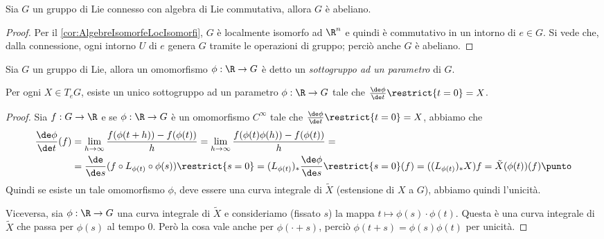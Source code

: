 \begin{corollary}
	Sia $G$ un gruppo di Lie connesso con algebra di Lie commutativa, allora $G$ è abeliano.
\end{corollary}
\begin{proof}
	Per il \cref{cor:AlgebreIsomorfeLocIsomorfi}, $G$ è localmente isomorfo ad $\R^n$ e quindi è commutativo in un intorno di $e \in G$. Si vede che, dalla connessione, ogni intorno $U$ di $e$ genera $G$ tramite le operazioni di gruppo; perciò anche $G$ è abeliano.
\end{proof}


\begin{definition} 
	Sia $G$ un gruppo di Lie, allora un omomorfismo $\phi : \R \to G$ è detto un \emph{sottogruppo ad un parametro} di $G$.
\end{definition}


\begin{corollary}
	Per ogni $X \in T_eG$, esiste un unico sottogruppo ad un parametro $\phi: \R \to G$ tale che $\frac{\de\phi}{\de t}\restrict{t=0} = X$.
\end{corollary}
\begin{proof}
	Sia $f:G\to \R$ e se $\phi: \R \to G$ è un omomorfismo $C^\infty$ tale che $\frac{\de\phi}{\de t}\restrict{t=0} = X$, abbiamo che
	\begin{align*}
		\frac{\de\phi}{\de t}(f) &= \lim_{h\to\infty} \frac{f(\phi(t+h))-f(\phi(t))}{h} = \lim_{h\to\infty} \frac{f(\phi(t)\phi(h))-f(\phi(t))}{h} =\\
		&=\frac{\de}{\de s} (f\circ L_{\phi(t)} \circ \phi(s)) \restrict{s=0} = (L_{\phi(t)})_* \frac{\de\phi}{\de s}\restrict{s=0} (f) = (( L_{\phi(t)} )_* X) f = \tilde X(\phi(t)) (f) \punto
	\end{align*}
	Quindi se esiste un tale omomorfismo $\phi$, deve essere una curva integrale di $\tilde X$ (estensione di $X$ a $G$), abbiamo quindi l'unicità.
	
	Viceversa, sia $\phi: \R \to G$ una curva integrale di $\tilde X$ e consideriamo (fissato $s$) la mappa $t\mapsto \phi(s)\cdot \phi(t)$.
	Questa è una curva integrale di $\tilde X$ che passa per $\phi(s)$ al tempo 0.
	Però la cosa vale anche per $\phi(\cdot + s)$, perciò $\phi(t+s) = \phi(s) \phi(t)$ per unicità.
\end{proof}


